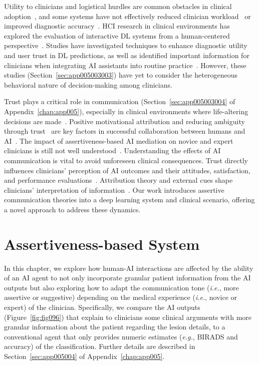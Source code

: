 Utility to clinicians and logistical hurdles are common obstacles in clinical adoption~\cite{Elwyn2013, Musen2021}, and some systems have not effectively reduced clinician workload~\cite{KOHLI2018535} or improved diagnostic accuracy~\cite{Cole2014fi, KOHLI2018535}.
\ac{HCI} research in clinical environments has explored the evaluation of interactive \ac{DL} systems from a human-centered perspective~\cite{10.1145/3311957.3359433, 10.1145/3359206, Fitzpatrick2013, 10.1145/3538882.3542790}.
Studies have investigated techniques to enhance diagnostic utility and user trust in \ac{DL} predictions, as well as identified important information for clinicians when integrating \ac{AI} assistants into routine practice~\cite{10.1145/3290605.3300234, 10.1145/3359206}.
However, these studies (Section~\ref{sec:app005003003}) have yet to consider the heterogeneous behavioral nature of decision-making among clinicians.

Trust plays a critical role in communication (Section~\ref{sec:app005003004} of Appendix~\ref{chap:app005}), especially in clinical environments where life-altering decisions are made~\cite{Amann2020}.
Positive motivational attribution and reducing ambiguity through trust~\cite{HOHENSTEIN2020106190} are key factors in successful collaboration between humans and \ac{AI}~\cite{10.1145/3479587, 10.1145/3334480.3375147, 10.1145/3334480.3382842}.
The impact of assertiveness-based \ac{AI} mediation on novice and expert clinicians is still not well understood~\cite{Lundberg2020, 10.1145/1518701.1518832}.
Understanding the effects of \ac{AI} communication is vital to avoid unforeseen clinical consequences.
Trust directly influences clinicians' perception of \ac{AI} outcomes and their attitudes, satisfaction, and performance evaluations~\cite{10.1145/3491102.3502104}.
Attribution theory and external cues shape clinicians' interpretation of information~\cite{LOMBROZO2010303}.
Our work introduces assertive communication theories into a deep learning system and clinical scenario, offering a novel approach to address these dynamics.

\section{Assertiveness-based System}
\label{sec:chap006003}

In this chapter, we explore how human-\ac{AI} interactions are affected by the ability of an \ac{AI} agent to not only incorporate granular patient information from the \ac{AI} outputs but also exploring how to adapt the communication tone ({\it i.e.}, more assertive or suggestive) depending on the medical experience ({\it i.e.}, novice or expert) of the clinician.
Specifically, we compare the \ac{AI} outputs (Figure~\ref{fig:fig096}) that explain to clinicians some clinical arguments with more granular information about the patient regarding the lesion details, to a conventional agent that only provides numeric estimates ({\it e.g.}, BIRADS and accuracy) of the classification.
Further details are described in Section~\ref{sec:app005004} of Appendix~\ref{chap:app005}.

